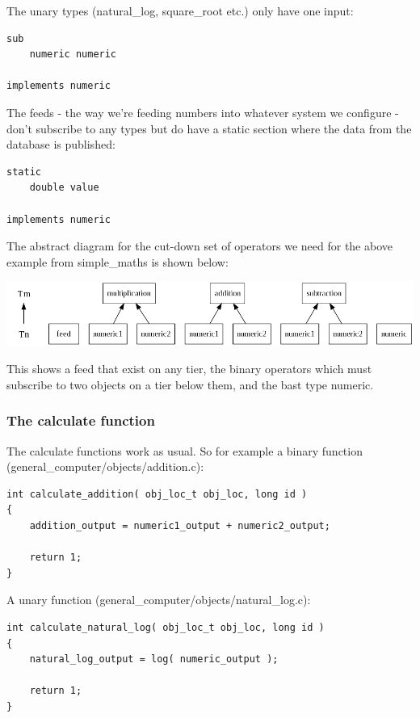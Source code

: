 \documentclass{report}
\begin{document}
The unary types (natural_log, square_root etc.) only have one input:

\begin{verbatim}
sub
    numeric numeric

implements numeric
\end{verbatim}

The feeds - the way we're feeding numbers into whatever system we configure - don't subscribe to any types but do have a static section where the data from the database is published:


\begin{verbatim}
static
    double value

implements numeric
\end{verbatim}

The abstract diagram for the cut-down set of operators we need for the above example from simple_maths is shown below:

\includegraphics[scale=0.4]{generalcomputerabstractsimple.png}

This shows a feed that exist on any tier, the binary operators which must subscribe to two objects on a tier below them, and the bast type numeric.

\subsubsection{The calculate function}

The calculate functions work as usual. So for example a binary function (general_computer/objects/addition.c):

\begin{verbatim}
int calculate_addition( obj_loc_t obj_loc, long id )
{
    addition_output = numeric1_output + numeric2_output;

    return 1;
}
\end{verbatim}

A unary function (general_computer/objects/natural_log.c):

\begin{verbatim}
int calculate_natural_log( obj_loc_t obj_loc, long id )
{
    natural_log_output = log( numeric_output );

    return 1;
}
\end{verbatim}
\end{document}
